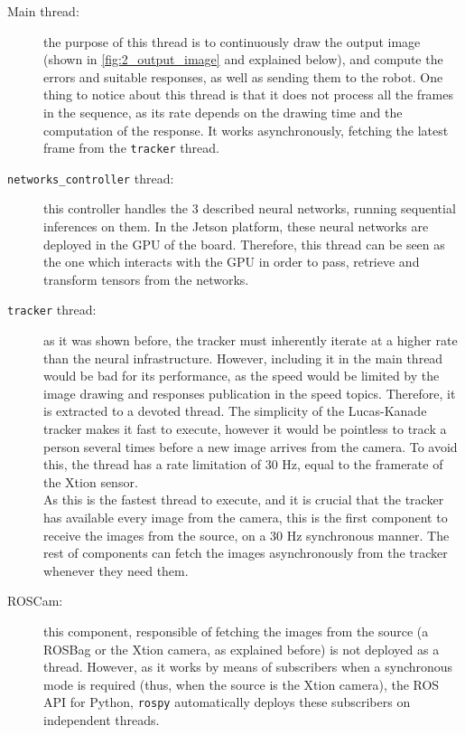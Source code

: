 \begin{description}
	\item[Main thread:] the purpose of this thread is to continuously draw the output image (shown in \autoref{fig:2_output_image} and explained below), and compute the errors and suitable responses, as well as sending them to the robot. One thing to notice about this thread is that it does not process all the frames in the sequence, as its rate depends on the drawing time and the computation of the response. It works asynchronously, fetching the latest frame from the \texttt{tracker} thread.
	
	\item[\texttt{networks\_controller} thread:] this controller handles the 3 described neural networks, running sequential inferences on them. In the Jetson platform, these neural networks are deployed in the GPU of the board. Therefore, this thread can be seen as the one which interacts with the GPU in order to pass, retrieve and transform tensors from the networks.
	
	\item[\texttt{tracker} thread:] as it was shown before, the tracker must inherently iterate at a higher rate than the neural infrastructure. However, including it in the main thread would be bad for its performance, as the speed would be limited by the image drawing and responses publication in the speed topics. Therefore, it is extracted to a devoted thread. The simplicity of the Lucas-Kanade tracker makes it fast to execute, however it would be pointless to track a person several times before a new image arrives from the camera. To avoid this, the thread has a rate limitation of 30 Hz, equal to the framerate of the Xtion sensor.\\
	
	As this is the fastest thread to execute, and it is crucial that the tracker has available every image from the camera, this is the first component to receive the images from the source, on a 30 Hz synchronous manner. The rest of components can fetch the images asynchronously from the tracker whenever they need them.
	
	\item[ROSCam:] this component, responsible of fetching the images from the source (a ROSBag or the Xtion camera, as explained before) is not deployed as a thread. However, as it works by means of subscribers when a synchronous mode is required (thus, when the source is the Xtion camera), the ROS API for Python, \texttt{rospy} automatically deploys these subscribers on independent threads.
\end{description}


